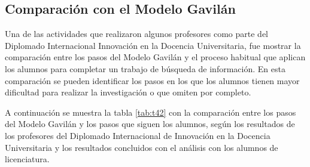 
\subsection{Comparación con el Modelo Gavilán}
\label{ComparacionModeloGavilancapIV}

Una de las actividades que realizaron algunos profesores como parte del Diplomado Internacional Innovación en la Docencia Universitaria, fue mostrar la comparación entre los pasos del Modelo Gavilán y el proceso habitual que aplican los alumnos para completar un trabajo de búsqueda de información. En esta comparación se pueden identificar los pasos en los que los alumnos tienen mayor dificultad para realizar la investigación o que omiten por completo.

A continuación se muestra la tabla \ref{tab:t42} con la comparación entre los pasos del Modelo Gavilán y los pasos que siguen los alumnos, según los resultados de los profesores del Diplomado Internacional de Innovación en la Docencia Universitaria y los resultados concluidos con el análisis con los alumnos de licenciatura.

